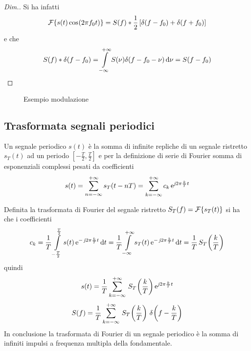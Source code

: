 \begin{proof}[Dim.]
Si ha infatti \[\operatorname{\mathcal{F}}\!\left\lbrace{s(t)\,{\operatorname{cos}}^{}\!\left({2\pi f_0 t}\right)}\right\rbrace=S(f)\ast\frac{1}{2}\left[\delta(f-f_0)+\delta(f+f_0)\right]\] e che \[S(f)\ast\delta(f-f_0)=\int\limits_{-\infty}^{+\infty}{S(\nu)\delta(f-f_0-\nu)}{\,\mathop{}\!\mathrm{d}{\nu}}=S(f-f_0)\qedhere\]
\end{proof}

\begin{figure}[!ht]
\centering
{}\qquad{}
\caption{Esempio modulazione}
\end{figure}

\subsection{Trasformata segnali periodici}
Un segnale periodico $s(t)$ è la somma di infinite repliche di un segnale ristretto $s_T(t)$ ad un periodo $\left[-\frac{T}{2},\frac{T}{2}\right]$ e per la definizione di serie di Fourier somma di esponenziali complessi pesati da coefficienti
\begin{equation}
s(t)=\sum_{n=-\infty}^{+\infty}{s_T(t-n T)}=\sum_{k=-\infty}^{+\infty}{c_k\operatorname{e}^{\operatorname{\mathit{j}\!} 2\pi\frac{k}{T}t}}
\end{equation}

Definita la trasformata di Fourier del segnale ristretto $S_T(f)=\operatorname{\mathcal{F}}\!\left\lbrace{s_T(t)}\right\rbrace$ si ha che i coefficienti 	\[c_k=\frac{1}{T}\int\limits_{-\frac{T}{2}}^{\frac{T}{2}}{s(t)\operatorname{e}^{-\operatorname{\mathit{j}\!} 2\pi\frac{k}{T}t}}{\,\mathop{}\!\mathrm{d}{t}}=\frac{1}{T}\int\limits_{-\infty}^{+\infty}{s_T(t)\operatorname{e}^{-\operatorname{\mathit{j}\!} 2\pi\frac{k}{T}t}}{\,\mathop{}\!\mathrm{d}{t}}=\frac{1}{T}\,{S_T}^{}\!\left({\frac{k}{T}}\right)\]
quindi
\[s(t)=\frac{1}{T}\sum_{k=-\infty}^{+\infty}{\,{S_T}^{}\!\left({\frac{k}{T}}\right)\operatorname{e}^{\operatorname{\mathit{j}\!} 2\pi\frac{k}{T}t}}\]
\begin{equation}
S(f)=\frac{1}{T}\sum_{k=-\infty}^{+\infty}{\,{S_T}^{}\!\left({\frac{k}{T}}\right)\,{\delta}^{}\!\left({f-\frac{k}{T}}\right)}
\end{equation}
In conclusione la trasformata di Fourier di un segnale periodico è la somma di infiniti impulsi a frequenza multipla della fondamentale.

